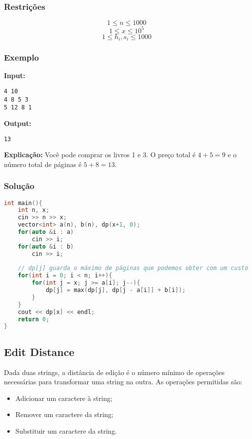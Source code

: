 \subsubsection*{Restrições}
\[
1 \le n \le 1000
\]
\[
1 \le x \le 10^5
\]
\[
1 \le h_i, s_i \le 1000
\]

\subsubsection*{Exemplo}

\textbf{Input:}
\begin{verbatim}
4 10
4 8 5 3
5 12 8 1
\end{verbatim}

\textbf{Output:}
\begin{verbatim}
13
\end{verbatim}

\textbf{Explicação:} Você pode comprar os livros 1 e 3. O preço total é \(4+5=9\) e o número total de páginas é \(5+8=13\).

\subsubsection*{Solução}
\begin{lstlisting}[language=C++]
int main(){
    int n, x;
    cin >> n >> x;
    vector<int> a(n), b(n), dp(x+1, 0);
    for(auto &i : a) 
        cin >> i;
    for(auto &i : b) 
        cin >> i;
    
    // dp[j] guarda o máximo de páginas que podemos obter com um custo total j
    for(int i = 0; i < n; i++){
        for(int j = x; j >= a[i]; j--){
            dp[j] = max(dp[j], dp[j - a[i]] + b[i]);
        }
    }
    cout << dp[x] << endl;
    return 0;
}
\end{lstlisting}

\subsection{Edit Distance}
Dada duas strings, a distância de edição é o número mínimo de operações necessárias para transformar uma string na outra. As operações permitidas são:
\begin{itemize}
    \item Adicionar um caractere à string;
    \item Remover um caractere da string;
    \item Substituir um caractere da string.
\end{itemize}

